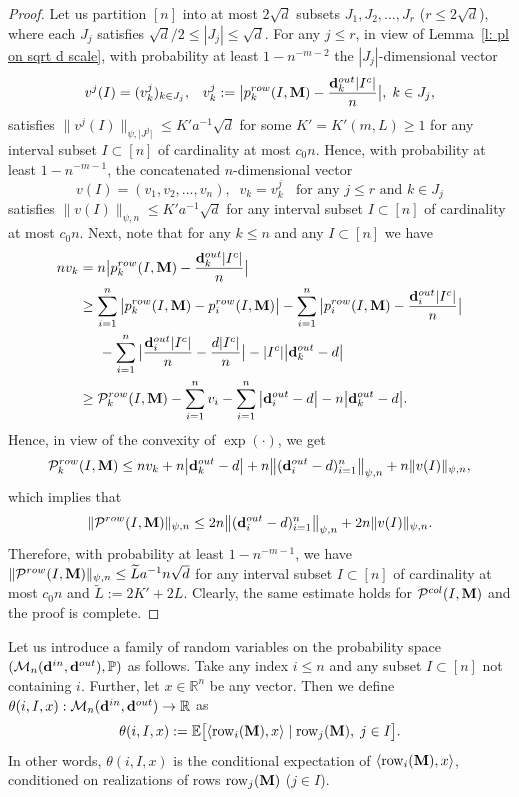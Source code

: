\documentclass[12pt]{article}
\theoremstyle{definition}
\theoremstyle{plain}
\newcommand{\E}{\mathbb{E}}
\newcommand{\R}{\mathbb{R}}
\def\ranmtx{{\bf{}M}}
\def\Prob{{\mathbb P}}
\def\InDeg{{\bf d}^{in}}
\def\OutDeg{{\bf d}^{out}}
\def\MatrixSet{{\mathcal M}_n}
\def\Row{{\rm row}}
\def\pvector{{\mathcal P}}
\begin{document}
\begin{proof}
Let us partition $[n]$ into at most $2\sqrt{d}$ subsets $J_1,J_2,\dots,J_r$ ($r\leq 2\sqrt{d}$),
where each $J_j$ satisfies $\sqrt{d}/2\leq |J_j|\leq \sqrt{d}$.
For any $j\leq r$, in view of Lemma~\ref{l: pl on sqrt d scale}, with
probability at least $1-n^{-m-2}$ the $|J_j|$-dimensional vector
$$v^j(I)=(v_k^j)_{k\in J_j},\;\;\;
v_k^j:=\big|p^{row}_k(I,\ranmtx)-\frac{\OutDeg_k|I^c|}{n}\big|,\;k\in J_j,$$
satisfies $\|v^j(I)\|_{\psi, \vert J^j\vert} \leq K'a^{-1}\sqrt{d}$ for some $K'=K'(m, L)\geq 1$ for any 
interval subset $I\subset[n]$ of cardinality at most $c_0 n$. 
Hence, with probability at least $1-n^{-m-1}$, the concatenated $n$-dimensional vector
$$v(I)=(v_1,v_2,\dots,v_n),\;\;v_k=v_k^j\;\;\mbox{ for any $j\leq r$ and $k\in J_j$}$$
satisfies $\|v(I)\|_{\psi,n}\leq K' a^{-1}\sqrt{d}$ for any 
interval subset $I\subset[n]$ of cardinality at most $c_0 n$. 
Next, note that for any $k\leq n$ and any $I\subset [n]$ we have
\begin{align*}
nv_k&=n\big|p^{row}_k(I,\ranmtx)-\frac{\OutDeg_k|I^c|}{n}\big|\\
&\geq \sum_{i=1}^n \big|p^{row}_k(I,\ranmtx)-p^{row}_i(I,\ranmtx)\big|
-\sum_{i=1}^n \big|p^{row}_i(I,\ranmtx)-\frac{\OutDeg_i|I^c|}{n}\big|\\
&\hspace{0.5cm}-\sum_{i=1}^n \big|\frac{\OutDeg_i|I^c|}{n}-\frac{d|I^c|}{n}\big|
-|I^c|\big|\OutDeg_k-d\big|\\
&\geq \pvector^{row}_k(I,\ranmtx) -\sum_{i=1}^n v_i-\sum_{i=1}^n\big|\OutDeg_i-d\big|
-n\big|\OutDeg_k-d\big|.
\end{align*}
Hence, in view of the convexity of $\exp(\cdot)$, we get
$$\pvector^{row}_k(I,\ranmtx)\leq n v_k+n\big|\OutDeg_k-d\big|
+n\big\|(\OutDeg_i-d)_{i=1}^n\big\|_{\psi,n}
+n \|v(I)\|_{\psi,n},
$$
which implies that
$$\|\pvector^{row}(I,\ranmtx)\|_{\psi,n}\leq 2n\big\|(\OutDeg_i-d)_{i=1}^n\big\|_{\psi,n}
+2n\|v(I)\|_{\psi,n}.$$
Therefore, with probability at least $1-n^{-m-1}$, we have $\|\pvector^{row}(I,\ranmtx)\|_{\psi,n}\leq \widetilde La^{-1}n\sqrt{d}$ for any 
interval subset $I\subset[n]$ of cardinality at most $c_0 n$ and
$\widetilde L:=2K'+2L$.
Clearly, the same estimate holds for $\pvector^{col}(I,\ranmtx)$ and the proof is complete.
\end{proof}

\bigskip

Let us introduce a family of random variables on the probability space $(\MatrixSet(\InDeg,\OutDeg),\Prob)$
as follows.
Take any index $i\leq n$ and any subset $I\subset[n]$ not containing $i$.
Further, let $x\in\R^n$ be any vector.
Then we define $\theta(i,I,x):\MatrixSet(\InDeg,\OutDeg)\to\R$ as
$$\theta(i,I,x):=\E\big[\langle \Row_i(\ranmtx),x\rangle\mid\Row_j(\ranmtx),\;j\in I\big].$$
In other words, $\theta(i,I,x)$ is the conditional expectation of $\langle \Row_i(\ranmtx),x\rangle$,
conditioned on realizations of rows $\Row_j(\ranmtx)$ ($j\in I$).
\end{document}
